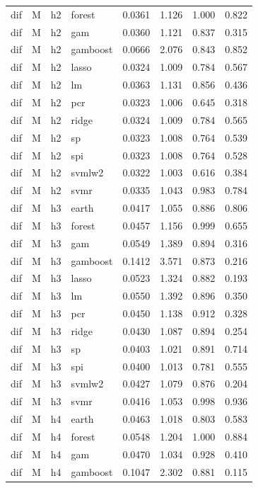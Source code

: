 \begin{ThreePartTable}
\begin{longtable}[t]{llclcccc}
dif & M & h2 & forest & 0.0361 & 1.126 & 1.000 & 0.822\\
dif & M & h2 & gam & 0.0360 & 1.121 & 0.837 & 0.315\\
dif & M & h2 & gamboost & 0.0666 & 2.076 & 0.843 & 0.852\\
dif & M & h2 & lasso & 0.0324 & 1.009 & 0.784 & 0.567\\
dif & M & h2 & lm & 0.0363 & 1.131 & 0.856 & 0.436\\
dif & M & h2 & pcr & 0.0323 & 1.006 & 0.645 & 0.318\\
dif & M & h2 & ridge & 0.0324 & 1.009 & 0.784 & 0.565\\
dif & M & h2 & sp & 0.0323 & 1.008 & 0.764 & 0.539\\
dif & M & h2 & spi & 0.0323 & 1.008 & 0.764 & 0.528\\
dif & M & h2 & svmlw2 & 0.0322 & 1.003 & 0.616 & 0.384\\
dif & M & h2 & svmr & 0.0335 & 1.043 & 0.983 & 0.784\\
\addlinespace
dif & M & h3 & earth & 0.0417 & 1.055 & 0.886 & 0.806\\
dif & M & h3 & forest & 0.0457 & 1.156 & 0.999 & 0.655\\
dif & M & h3 & gam & 0.0549 & 1.389 & 0.894 & 0.316\\
dif & M & h3 & gamboost & 0.1412 & 3.571 & 0.873 & 0.216\\
dif & M & h3 & lasso & 0.0523 & 1.324 & 0.882 & 0.193\\
dif & M & h3 & lm & 0.0550 & 1.392 & 0.896 & 0.350\\
dif & M & h3 & pcr & 0.0450 & 1.138 & 0.912 & 0.328\\
dif & M & h3 & ridge & 0.0430 & 1.087 & 0.894 & 0.254\\
dif & M & h3 & sp & 0.0403 & 1.021 & 0.891 & 0.714\\
dif & M & h3 & spi & 0.0400 & 1.013 & 0.781 & 0.555\\
dif & M & h3 & svmlw2 & 0.0427 & 1.079 & 0.876 & 0.204\\
dif & M & h3 & svmr & 0.0416 & 1.053 & 0.998 & 0.936\\
\addlinespace
dif & M & h4 & earth & 0.0463 & 1.018 & 0.803 & 0.583\\
dif & M & h4 & forest & 0.0548 & 1.204 & 1.000 & 0.884\\
dif & M & h4 & gam & 0.0470 & 1.034 & 0.928 & 0.410\\
dif & M & h4 & gamboost & 0.1047 & 2.302 & 0.881 & 0.115\\

\end{longtable}
\end{ThreePartTable}
